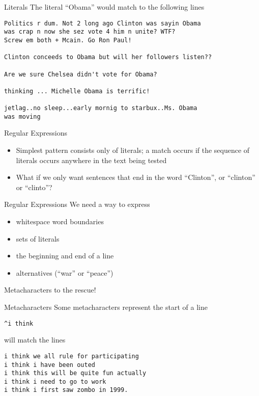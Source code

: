 \documentclass[aspectratio=169]{beamer}
\begin{document}
\begin{frame}[fragile]{Literals}
The literal ``Obama'' would match to the following lines
\begin{verbatim}
Politics r dum. Not 2 long ago Clinton was sayin Obama 
was crap n now she sez vote 4 him n unite? WTF? 
Screw em both + Mcain. Go Ron Paul!

Clinton conceeds to Obama but will her followers listen??  

Are we sure Chelsea didn't vote for Obama?

thinking ... Michelle Obama is terrific!

jetlag..no sleep...early mornig to starbux..Ms. Obama 
was moving
\end{verbatim}
\end{frame}

\begin{frame}{Regular Expressions}
\begin{itemize}
\item
Simplest pattern consists only of literals; a match occurs if the
sequence of literals occurs anywhere in the text being tested
\item
What if we only want sentences that end in 
the word ``Clinton'', or ``clinton'' or ``clinto''? 
\end{itemize}
\end{frame}

\begin{frame}{Regular Expressions}
We need a way to express
\begin{itemize}
\item
whitespace word boundaries
\item
sets of literals
\item
the beginning and end of a line
\item
alternatives (``war'' or ``peace'')
\end{itemize}
Metacharacters to the rescue!
\end{frame}

\begin{frame}[fragile]{Metacharacters}
Some metacharacters represent the start of a line
\begin{verbatim}
^i think 
\end{verbatim}
will match the lines 
\begin{verbatim}
i think we all rule for participating
i think i have been outed
i think this will be quite fun actually
i think i need to go to work
i think i first saw zombo in 1999.
\end{verbatim}
\end{frame}
\end{document}

